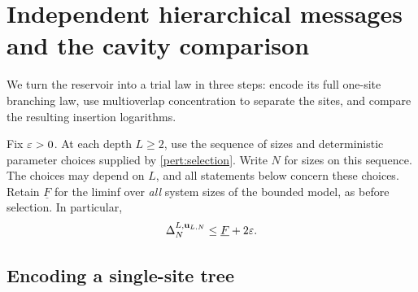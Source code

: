 \section{Independent hierarchical messages and the cavity comparison}
\label{comp:section}

We turn the reservoir into a trial law in three steps: encode its full
one-site branching law, use multioverlap concentration to separate the
sites, and compare the resulting insertion logarithms.

Fix $\varepsilon>0$. At each depth $L\ge2$, use the sequence of sizes and
deterministic parameter choices supplied by \cref{pert:selection}.
Write $N$ for sizes on this sequence. The choices may depend on $L$, and all statements below concern
these choices. Retain $\underline F$ for the liminf over \emph{all} system
sizes of the bounded model, as before selection. In particular,
\begin{equation}\label{comp:low-increments}
 \Delta_N^{L,\mathbf u_{L,N}}\le\underline F+2\varepsilon.
\end{equation}

\subsection{Encoding a single-site tree}


